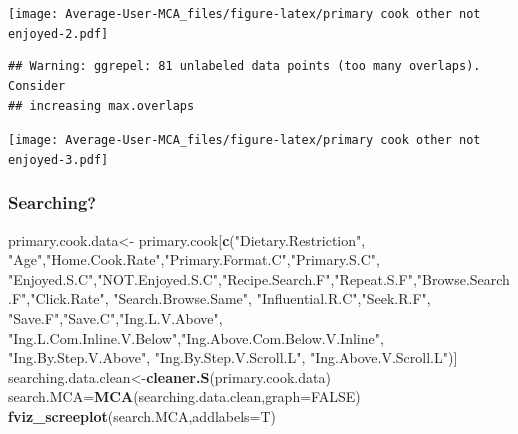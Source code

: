 \documentclass[
]{article}
\newenvironment{Shaded}{\begin{snugshade}}{\end{snugshade}}
\newcommand{\DataTypeTok}[1]{\textcolor[rgb]{0.13,0.29,0.53}{#1}}
\newcommand{\KeywordTok}[1]{\textcolor[rgb]{0.13,0.29,0.53}{\textbf{#1}}}
\newcommand{\NormalTok}[1]{#1}
\newcommand{\OtherTok}[1]{\textcolor[rgb]{0.56,0.35,0.01}{#1}}
\newcommand{\StringTok}[1]{\textcolor[rgb]{0.31,0.60,0.02}{#1}}
\begin{document}
\texttt{[image: Average-User-MCA\_files/figure-latex/primary cook other not enjoyed-2.pdf]}

\begin{Shaded}
\end{Shaded}

\begin{verbatim}
## Warning: ggrepel: 81 unlabeled data points (too many overlaps). Consider
## increasing max.overlaps
\end{verbatim}

\texttt{[image: Average-User-MCA\_files/figure-latex/primary cook other not enjoyed-3.pdf]}

\hypertarget{searching-3}{%
\subsubsection{Searching?}\label{searching-3}}

\begin{Shaded}
\begin{Highlighting}[]
\NormalTok{primary.cook.data<-}\StringTok{ }\NormalTok{primary.cook[}\KeywordTok{c}\NormalTok{(}\StringTok{"Dietary.Restriction"}\NormalTok{, }\StringTok{"Age"}\NormalTok{,}\StringTok{"Home.Cook.Rate"}\NormalTok{,}\StringTok{"Primary.Format.C"}\NormalTok{,}\StringTok{"Primary.S.C"}\NormalTok{,}
            \StringTok{"Enjoyed.S.C"}\NormalTok{,}\StringTok{"NOT.Enjoyed.S.C"}\NormalTok{,}\StringTok{"Recipe.Search.F"}\NormalTok{,}\StringTok{"Repeat.S.F"}\NormalTok{,}\StringTok{"Browse.Search.F"}\NormalTok{,}\StringTok{"Click.Rate"}\NormalTok{,}
            \StringTok{"Search.Browse.Same"}\NormalTok{, }\StringTok{"Influential.R.C"}\NormalTok{,}\StringTok{"Seek.R.F"}\NormalTok{, }\StringTok{"Save.F"}\NormalTok{,}\StringTok{"Save.C"}\NormalTok{,}\StringTok{"Ing.L.V.Above"}\NormalTok{,}
            \StringTok{"Ing.L.Com.Inline.V.Below"}\NormalTok{,}\StringTok{"Ing.Above.Com.Below.V.Inline"}\NormalTok{,  }\StringTok{"Ing.By.Step.V.Above"}\NormalTok{,  }\StringTok{"Ing.By.Step.V.Scroll.L"}\NormalTok{,}
            \StringTok{"Ing.Above.V.Scroll.L"}\NormalTok{)]}
\NormalTok{searching.data.clean<-}\KeywordTok{cleaner.S}\NormalTok{(primary.cook.data)}
\NormalTok{search.MCA=}\KeywordTok{MCA}\NormalTok{(searching.data.clean,}\DataTypeTok{graph=}\OtherTok{FALSE}\NormalTok{)}
\KeywordTok{fviz_screeplot}\NormalTok{(search.MCA,}\DataTypeTok{addlabels=}\NormalTok{T)}
\end{Highlighting}
\end{Shaded}
\end{document}
